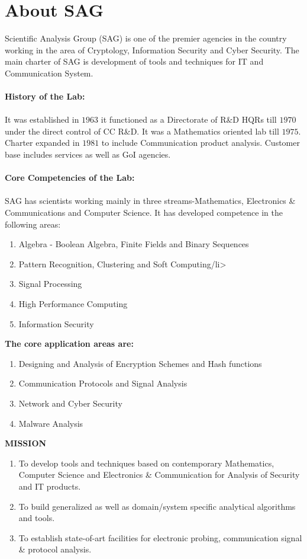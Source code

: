 \documentclass[12pt]{report}
\begin{document}
\section{About SAG}
Scientific Analysis Group (SAG) is one of the premier agencies in the country working in the area of Cryptology, Information Security and Cyber Security. The main charter of SAG is development of tools and techniques for IT and Communication System. \\ \\
\textbf{History of the Lab:}
\\\\It was established in $1963$ it functioned as a Directorate of R\&D HQRs till $1970$ under the direct control of CC R\&D. It was a Mathematics oriented lab till $1975$. Charter expanded in $1981$ to include Communication product analysis. Customer base includes services as well as GoI agencies. 
\\
\\ \textbf{Core Competencies of the Lab:} \\
\\SAG has scientists working mainly in three streams-Mathematics, Electronics \& Communications and Computer Science. It has developed competence in the following areas:
\begin{enumerate}
\item Algebra - Boolean Algebra, Finite Fields and Binary Sequences
\item Pattern Recognition, Clustering and Soft Computing/li>
\item Signal Processing
\item High Performance Computing
\item Information Security
\end{enumerate}
\textbf{The core application areas are:} 
\begin{enumerate}
\item Designing and Analysis of Encryption Schemes and Hash functions
\item Communication Protocols and Signal Analysis
\item Network and Cyber Security
\item Malware Analysis
\end{enumerate}
\textbf{MISSION}
\begin{enumerate}
\item To develop tools and techniques based on contemporary Mathematics, Computer Science and Electronics \& Communication for Analysis of Security and IT products.
\item To build generalized as well as domain/system specific analytical algorithms and tools.
\item To establish state-of-art facilities for electronic probing, communication signal \& protocol analysis.
\end{enumerate}
\newpage
\end{document}

